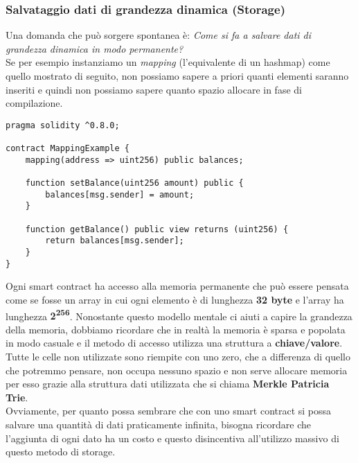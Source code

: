 \subsubsection{Salvataggio dati di grandezza dinamica (Storage)}
Una domanda che può sorgere spontanea è: \textit{Come si fa a salvare dati di
grandezza dinamica in modo permanente?} \\
Se per esempio instanziamo un \textit{mapping} (l'equivalente di un hashmap)
come quello mostrato di seguito, non possiamo sapere a priori quanti elementi
saranno inseriti e quindi non possiamo sapere quanto spazio allocare in fase di
compilazione.

\begin{lstlisting}[language=Solidity]
pragma solidity ^0.8.0;

contract MappingExample {
    mapping(address => uint256) public balances;

    function setBalance(uint256 amount) public {
        balances[msg.sender] = amount;
    }

    function getBalance() public view returns (uint256) {
        return balances[msg.sender];
    }
}
\end{lstlisting}

Ogni smart contract ha accesso alla memoria permanente che può essere pensata
come se fosse un array in cui ogni elemento è di lunghezza \textbf{32 byte} e
l'array ha lunghezza \textbf{2\textsuperscript{256}}. Nonostante questo modello
mentale ci aiuti a capire la grandezza della memoria, dobbiamo ricordare che in
realtà la memoria è sparsa e popolata in modo casuale e il metodo di accesso
utilizza una struttura a \textbf{chiave/valore}. Tutte le celle non utilizzate
sono riempite con uno zero, che a differenza di quello che potremmo pensare,
non occupa nessuno spazio e non serve allocare memoria per esso grazie alla
struttura dati utilizzata che si chiama \textbf{Merkle Patricia Trie}. \\
Ovviamente, per quanto possa sembrare che con uno smart contract si possa 
salvare una quantità di dati praticamente infinita, bisogna ricordare che 
l'aggiunta di ogni dato ha un costo e questo disincentiva all'utilizzo massivo
di questo metodo di storage.

